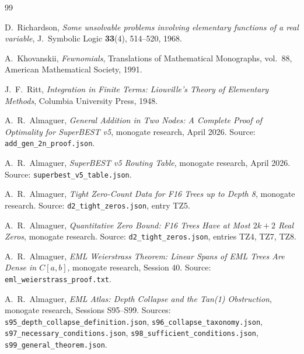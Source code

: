 \documentclass[12pt,a4paper]{article}
\theoremstyle{definition}
\begin{document}
\begin{thebibliography}{99}

  D.\ Richardson, \emph{Some unsolvable problems involving elementary functions
  of a real variable}, J.\ Symbolic Logic \textbf{33}(4), 514--520, 1968.

  A.\ Khovanskii, \emph{Fewnomials}, Translations of Mathematical Monographs,
  vol.\ 88, American Mathematical Society, 1991.

  J.\ F.\ Ritt, \emph{Integration in Finite Terms: Liouville's Theory of
  Elementary Methods}, Columbia University Press, 1948.

  A.\ R.\ Almaguer, \emph{General Addition in Two Nodes: A Complete Proof of
  Optimality for SuperBEST v5},
  monogate research, April 2026.
  Source: \texttt{add\_gen\_2n\_proof.json}.

  A.\ R.\ Almaguer, \emph{SuperBEST v5 Routing Table},
  monogate research, April 2026.
  Source: \texttt{superbest\_v5\_table.json}.

  A.\ R.\ Almaguer, \emph{Tight Zero-Count Data for F16 Trees up to Depth 8},
  monogate research.
  Source: \texttt{d2\_tight\_zeros.json}, entry TZ5.

  A.\ R.\ Almaguer, \emph{Quantitative Zero Bound: F16 Trees Have at Most
  $2k+2$ Real Zeros},
  monogate research.
  Source: \texttt{d2\_tight\_zeros.json}, entries TZ4, TZ7, TZ8.

  A.\ R.\ Almaguer, \emph{EML Weierstrass Theorem: Linear Spans of EML Trees
  Are Dense in $C[a,b]$},
  monogate research, Session 40.
  Source: \texttt{eml\_weierstrass\_proof.txt}.

  A.\ R.\ Almaguer, \emph{EML Atlas: Depth Collapse and the Tan(1) Obstruction},
  monogate research, Sessions S95--S99.
  Sources: \texttt{s95\_depth\_collapse\_definition.json},
  \texttt{s96\_collapse\_taxonomy.json},
  \texttt{s97\_necessary\_conditions.json},
  \texttt{s98\_sufficient\_conditions.json},
  \texttt{s99\_general\_theorem.json}.

\end{thebibliography}
\end{document}
